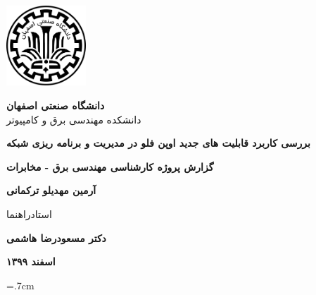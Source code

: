 \thispagestyle{empty}
\begin{center}
\includegraphics[height=3cm]{imgs/iut_logo.png}
\vspace{0.5cm}

{\large
	\textbf{دانشگاه صنعتی اصفهان}\\
	دانشکده مهندسی برق و کامپیوتر
}
\vspace{3.5cm}

{\LARGE
	\textbf{بررسی کاربرد قابلیت های جدید اوپن فلو در مدیریت و برنامه ریزی شبکه}\\
}
\vspace{3.5cm}

{\large
	\textbf{گزارش پروژه کارشناسی مهندسی برق - مخابرات}\\
}
\vspace{1cm}

{\Large
	\textbf{آرمین مهدیلو ترکمانی}\\
}
\vspace{2.5cm}

{\large
	استادراهنما\\
}
\vspace{0.5cm}

{\Large
	\textbf{دکتر مسعودرضا هاشمی}\\
}
\vspace{3.5cm}

{\Large
	\textbf{اسفند ۱۳۹۹}
}

\end{center}
\restoregeometry
\pagebreak




\baselineskip=.7cm

\tableofcontents
\pagebreak


\titlespacing*{\chapter}{0pt}{3.5cm}{6cm}
